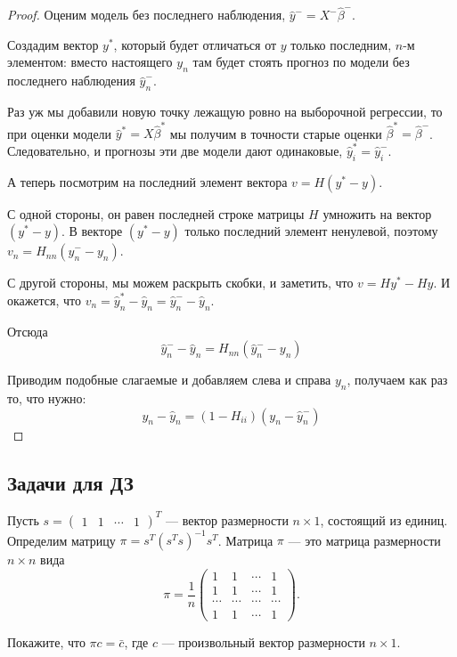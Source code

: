 \documentclass[12pt]{article}
\begin{document}
\begin{proof}
Оценим модель без последнего наблюдения, $\hat y^{-} = X^{-} \hat\beta^{-}$. 

Создадим вектор $y^{*}$, который будет отличаться от $y$ только последним, $n$-м элементом:
вместо настоящего $y_n$ там будет стоять прогноз по модели без последнего наблюдения $\hat y^{-}_n$.

Раз уж мы добавили новую точку лежащую ровно на выборочной регрессии, то при оценки модели
$\hat y^* = X \hat \beta^*$ мы получим в точности старые оценки $\hat \beta^* = \hat \beta^-$. 
Следовательно, и прогнозы эти две модели дают одинаковые, $\hat y_i^* = \hat y_i^-$.

А теперь посмотрим на последний элемент вектора $v = H (y^* - y)$.

С одной стороны, он равен последней строке матрицы $H$ умножить на вектор $(y^* - y)$. 
В векторе $(y^* - y)$ только последний элемент ненулевой, поэтому $v_n = H_{nn} (\hat y^{-}_n - y_n)$.

С другой стороны, мы можем раскрыть скобки, и заметить, что $v = Hy^* - Hy$. 
И окажется, что $v_n = \hat y_n^* - \hat y_n = \hat y_n^- - \hat y_n$.

Отсюда
\[
 \hat y_n^- - \hat y_n = H_{nn} (\hat y_n^- - y_n)
\]

Приводим подобные слагаемые и добавляем слева и справа $y_n$, получаем как раз то, что нужно:
\[
y_n - \hat y_n   = (1 - H_{ii}) (y_n - \hat y_n^- )
\]
\end{proof}


\subsection{Задачи для ДЗ}
\begin{problem}
Пусть 
$s = 
 \begin{pmatrix}
  1 & 1 & \cdots & 1
 \end{pmatrix}^{T}$ — вектор размерности $n \times 1$, состоящий из единиц.
Определим матрицу $\pi = s^{T}(s^{T}s)^{-1}s^{T}$. Матрица $\pi$ — это матрица размерности $n \times n$ вида
\[
\pi = \frac{1}{n}
 \begin{pmatrix}
  1 & 1 & \cdots & 1\\
  1 & 1 & \cdots & 1\\
  \cdots & \cdots & \cdots & \cdots \\
  1 & 1 & \cdots & 1
 \end{pmatrix}.
 \]
 
Покажите, что $\pi c = \bar c$, где $c$ — произвольный вектор размерности $n \times 1$.
\end{problem}
\end{document}
